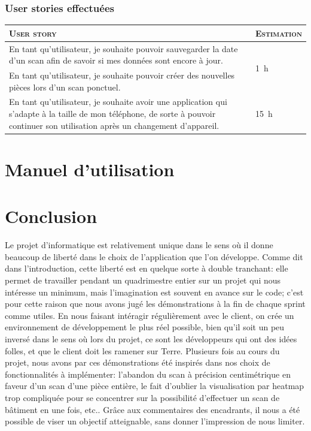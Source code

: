 \documentclass{elsarticle}
\newcommand{\est}[1]{\multirow{2}{*}{\SI{#1}{\hour}}}
\newcommand{\estbis}[1]{\SI{#1}{\hour}}
\begin{document}
\subsubsection{User stories effectuées}
\begin{table}[H]
\centering
\begin{tabular}{p{14cm}m{2cm}}
	\toprule
	\textsc{User story} & \textsc{Estimation}\\
	\midrule
	En tant qu'utilisateur, je souhaite pouvoir sauvegarder la date d'un scan afin de savoir si mes données sont encore à jour. & \est{1}\\
	\midrule
	En tant qu'utilisateur, je souhaite pouvoir créer des nouvelles pièces lors d'un scan ponctuel. & \estbis{7}\\
	\midrule
	En tant qu'utilisateur, je souhaite avoir une application qui s'adapte à la taille de mon téléphone, de sorte à pouvoir continuer son utilisation après un changement d'appareil. & \est{15}\\
	\bottomrule
\end{tabular}
\end{table}

\section{Manuel d'utilisation}

\section{Conclusion}
Le projet d'informatique est relativement unique dans le sens où il donne beaucoup de liberté dans le choix de l'application que l'on développe.
Comme dit dans l'introduction, cette liberté est en quelque sorte à double tranchant: elle permet de travailler pendant un quadrimestre entier sur un projet qui nous intéresse un minimum, mais l'imagination est souvent en avance sur le code; c'est pour cette raison que nous avons jugé les démonstrations à la fin de chaque sprint comme utiles.
En nous faisant intéragir régulièrement avec le \og client\fg, on crée un environnement de développement le plus réel possible, bien qu'il soit un peu inversé dans le sens où lors du projet, ce sont les développeurs qui ont des idées folles, et que le client doit les ramener sur Terre.
Plusieurs fois au cours du projet, nous avons par ces démonstrations été inspirés dans nos choix de fonctionnalités à implémenter: l'abandon du scan à précision centimétrique en faveur d'un scan d'une pièce entière, le fait d'oublier la visualisation par heatmap trop compliquée pour se concentrer sur la possibilité d'effectuer un scan de bâtiment en une fois, etc..
Grâce aux commentaires des encadrants, il nous a été possible de viser un objectif atteignable, sans donner l'impression de nous limiter.
\end{document}
